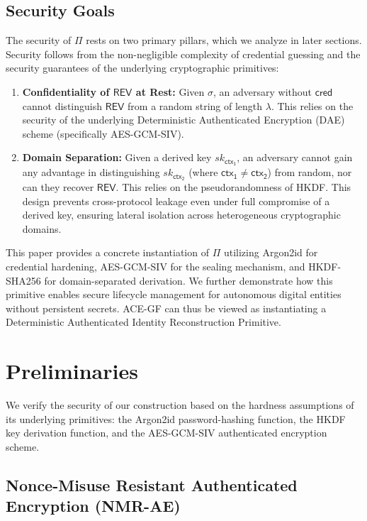 \documentclass[12pt,a4paper]{article}
\begin{document}
  \subsection{Security Goals}

  The security of $\Pi$ rests on two primary pillars, which we analyze in later sections. Security follows from the non-negligible complexity of credential guessing and the security guarantees of the underlying cryptographic primitives:
  \begin{enumerate}
   \item \textbf{Confidentiality of $\mathsf{REV}$ at Rest:} Given $\sigma$, an adversary without $\mathsf{cred}$ cannot distinguish $\mathsf{REV}$ from a random string of length $\lambda$. This relies on the security of the underlying Deterministic Authenticated Encryption (DAE) scheme (specifically AES-GCM-SIV).
   \item \textbf{Domain Separation:} Given a derived key $sk_{\mathsf{ctx_1}}$, an adversary cannot gain any advantage in distinguishing $sk_{\mathsf{ctx_2}}$ (where $\mathsf{ctx_1} \neq \mathsf{ctx_2}$) from random, nor can they recover $\mathsf{REV}$. This relies on the pseudorandomness of HKDF. This design prevents cross-protocol leakage even under full compromise of a derived key, ensuring lateral isolation across heterogeneous cryptographic domains.
  \end{enumerate}

  This paper provides a concrete instantiation of $\Pi$ utilizing Argon2id for credential hardening, AES-GCM-SIV for the sealing mechanism, and HKDF-SHA256 for domain-separated derivation. We further demonstrate how this primitive enables secure lifecycle management for autonomous digital entities without persistent secrets. ACE-GF can thus be viewed as instantiating a Deterministic Authenticated Identity Reconstruction Primitive.

  \section{Preliminaries}

  We verify the security of our construction based on the hardness assumptions of its underlying primitives: the Argon2id password-hashing function, the HKDF key derivation function, and the AES-GCM-SIV authenticated encryption scheme.

  \subsection{Nonce-Misuse Resistant Authenticated Encryption (NMR-AE)}
\end{document}
